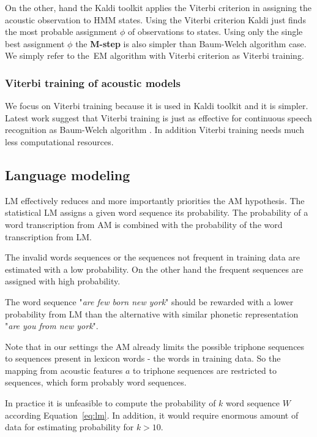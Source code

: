 {
On the other, hand the Kaldi toolkit applies the Viterbi 
criterion in assigning the acoustic observation to \ac{HMM} states.
Using the Viterbi criterion Kaldi just finds 
the most probable assignment $\phi$ of observations to states.\cite{buthpitiya2012parallel}
Using only the single best assignment $\phi$ the {\bf M-step} is also simpler than
Baum-Welch algorithm case.
We simply refer to the~\ac{EM} algorithm with Viterbi criterion as Viterbi training.

\subsubsection*{Viterbi training of acoustic models}
We focus on Viterbi training because it is used in Kaldi toolkit and it is simpler.
Latest work suggest that Viterbi training is just as effective for continuous
speech recognition as Baum-Welch algorithm \cite{rodriguez2003comparative}.
In addition Viterbi training needs much less computational resources. 


\subsection{Language modeling}
\label{sub:lm}

\ac{LM} effectively reduces and more importantly priorities the \ac{AM} hypothesis.
The statistical \ac{LM} assigns a given word sequence its probability.
The probability of a word transcription from \ac{AM} is combined with
the probability of the word transcription from \ac{LM}.

The invalid words sequences or the sequences not frequent in training data
are estimated with a low probability. On the other hand the frequent sequences
are assigned with high probability.

The word sequence "{\it are few born new york}" should be rewarded 
with a lower probability from \ac{LM} than the alternative with similar phonetic representation
"{\it are you from new york}".

Note that in our settings the \ac{AM} already limits the possible triphone
sequences to sequences present in lexicon words - the words in training data.
So the mapping from acoustic features $a$ to triphone sequences
are restricted to sequences, which form probably word sequences.

In practice it is unfeasible to compute the probability
of $k$ word sequence $W$ according Equation~\ref{eq:lm}.
In addition, it would require enormous amount of data for estimating
probability for $k>10$.


}
